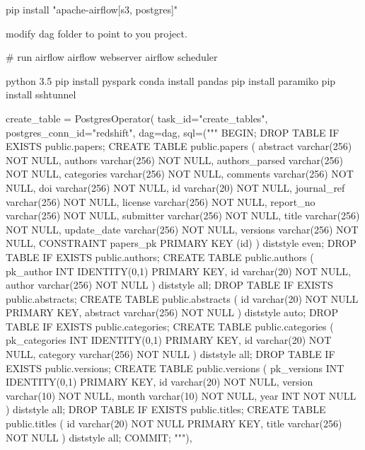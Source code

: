 pip install "apache-airflow[s3, postgres]"

modify dag folder to point to you project.

# run airflow
airflow webserver
airflow scheduler


python 3.5
pip install pyspark 
conda install pandas 
pip install paramiko
pip install sshtunnel

create_table = PostgresOperator(
    task_id="create_tables",
    postgres_conn_id="redshift",
    dag=dag,
    sql=("""
    BEGIN;
    DROP TABLE IF EXISTS public.papers; 
    CREATE TABLE public.papers (
    abstract varchar(256) NOT NULL,
    authors varchar(256) NOT NULL,
    authors_parsed varchar(256) NOT NULL,
    categories varchar(256) NOT NULL,
    comments varchar(256) NOT NULL,
    doi varchar(256) NOT NULL,
    id varchar(20) NOT NULL,
    journal_ref varchar(256) NOT NULL,
    license varchar(256) NOT NULL,
    report_no varchar(256) NOT NULL,
    submitter varchar(256) NOT NULL,
    title varchar(256) NOT NULL,
    update_date varchar(256) NOT NULL,
    versions varchar(256) NOT NULL,
    CONSTRAINT papers_pk PRIMARY KEY (id)
    ) diststyle even;
    DROP TABLE IF EXISTS public.authors; 
    CREATE TABLE public.authors (
        pk_author INT IDENTITY(0,1) PRIMARY KEY,
        id varchar(20) NOT NULL,
        author varchar(256) NOT NULL
    ) diststyle all;
    DROP TABLE IF EXISTS public.abstracts;
    CREATE TABLE public.abstracts (
        id varchar(20) NOT NULL PRIMARY KEY,
        abstract varchar(256) NOT NULL
    ) diststyle auto;
    DROP TABLE IF EXISTS public.categories;
    CREATE TABLE public.categories (
        pk_categories INT IDENTITY(0,1) PRIMARY KEY,
        id varchar(20) NOT NULL,
        category varchar(256) NOT NULL
    ) diststyle all;
    DROP TABLE IF EXISTS public.versions;
    CREATE TABLE public.versions (
        pk_versions INT IDENTITY(0,1) PRIMARY KEY,
        id varchar(20) NOT NULL,
        version varchar(10) NOT NULL,
        month varchar(10) NOT NULL,
        year INT NOT NULL
    ) diststyle all;
    DROP TABLE IF EXISTS public.titles;
    CREATE TABLE public.titles (
        id varchar(20) NOT NULL PRIMARY KEY,
        title varchar(256) NOT NULL
    ) diststyle all;
    COMMIT;
    """),